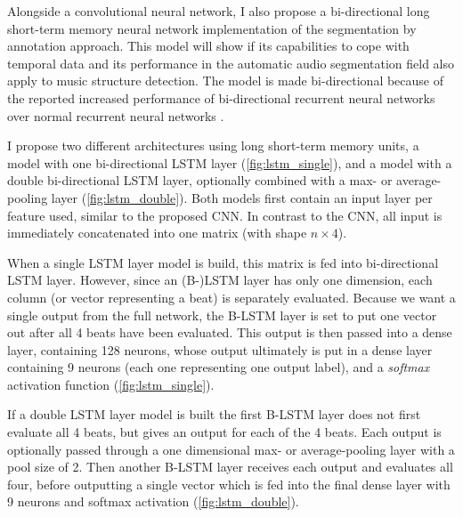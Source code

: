 Alongside a convolutional neural network, I also propose a bi-directional long short-term memory neural network implementation of the segmentation by annotation approach. This model will show if its capabilities to cope with temporal data and its performance in the automatic audio segmentation field also apply to music structure detection. The model is made bi-directional because of the reported increased performance of bi-directional recurrent neural networks over normal recurrent neural networks \cite{Schuster1997bidirectional}.

I propose two different architectures using long short-term memory units, a model with one bi-directional LSTM layer (\autoref{fig:lstm_single}), and a model with a double bi-directional LSTM layer, optionally combined with a max- or average-pooling layer (\autoref{fig:lstm_double}). Both models first contain an input layer per feature used, similar to the proposed CNN. In contrast to the CNN, all input is immediately concatenated into one matrix (with shape $n\times4$).

When a single LSTM layer model is build, this matrix is fed into bi-directional LSTM layer. However, since an (B-)LSTM layer has only one dimension, each column (or vector representing a beat) is separately evaluated. Because we want a single output from the full network, the B-LSTM layer is set to put one vector out after all 4 beats have been evaluated. This output is then passed into a dense layer, containing 128 neurons, whose output ultimately is put in a dense layer containing 9 neurons (each one representing one output label), and a \textit{softmax} activation function (\autoref{fig:lstm_single}).

If a double LSTM layer model is built the first B-LSTM layer does not first evaluate all 4 beats, but gives an output for each of the 4 beats. Each output is optionally passed through a one dimensional max- or average-pooling layer with a pool size of 2. Then another B-LSTM layer receives each output and evaluates all four, before outputting a single vector which is fed into the final dense layer with 9 neurons and softmax activation (\autoref{fig:lstm_double}).